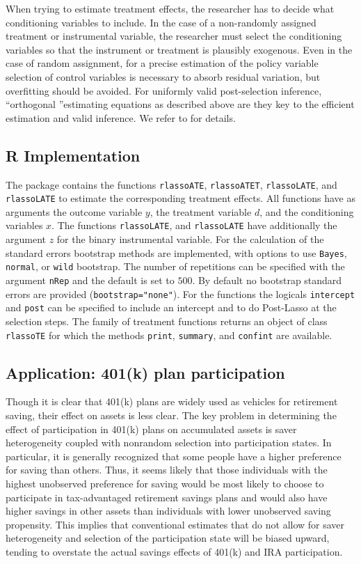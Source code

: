 \documentclass{amsart}\usepackage[]{graphicx}\usepackage[]{color}
\newcommand{\code}[1]{\texttt{#1}}
\begin{document}
When trying to estimate treatment effects, the researcher has to decide what conditioning variables to include. In the case of a non-randomly assigned treatment or instrumental variable, the researcher must select the conditioning variables so that the instrument or treatment is plausibly exogenous. Even in the case of random assignment, for a precise estimation of the policy variable selection of control variables is necessary to absorb residual variation, but overfitting should be avoided. For uniformly valid post-selection inference, \textquotedblleft orthogonal \textquotedblright estimating equations as described above are they key to the efficient estimation and valid inference. We refer to \citet{BCFH:Policy} for details.



\subsection*{R Implementation}
The package contains the functions \code{rlassoATE}, \code{rlassoATET}, \code{rlassoLATE}, and \code{rlassoLATE} to estimate the corresponding treatment effects. All functions have as arguments the outcome variable $y$, the treatment variable $d$, and the conditioning variables $x$. The functions \code{rlassoLATE}, and \code{rlassoLATE} have additionally the argument $z$ for the binary instrumental variable. For the calculation of the standard errors bootstrap methods are implemented, with options to use \code{Bayes}, \code{normal}, or \code{wild} bootstrap. The number of repetitions can be specified with the argument \code{nRep} and the default is set to $500$. By default no bootstrap standard errors are provided (\code{bootstrap="none"}). For the functions the logicals \code{intercept} and \code{post} can be specified to include an intercept and to do Post-Lasso at the selection steps. The family of treatment functions returns an object of class \code{rlassoTE} for which the methods \code{print}, \code{summary}, and \code{confint} are available.


\subsection{Application: 401(k) plan participation}
Though it is clear that 401(k) plans are widely used as vehicles for retirement saving, their effect on assets is less clear. The key problem in determining the effect of participation in 401(k) plans on
accumulated  assets  is  saver  heterogeneity  coupled  with
nonrandom selection into participation states. In particular,
it  is  generally  recognized  that  some  people  have  a  higher
preference for saving than others. Thus, it seems likely that
those individuals with the highest unobserved preference for
saving  would  be  most  likely  to  choose  to  participate  in
tax-advantaged  retirement  savings  plans  and  would  also
have  higher  savings  in  other  assets  than  individuals  with
lower unobserved saving propensity. This implies that conventional estimates that do not allow for saver heterogeneity
and  selection  of  the  participation  state  will  be  biased  upward,  tending  to  overstate  the  actual  savings  effects  of
401(k) and IRA participation.
\end{document}
